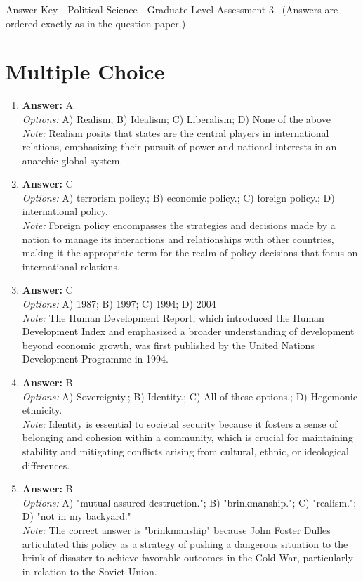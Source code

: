\documentclass[12pt]{article}
\begin{document}
\begin{center}
Answer Key - Political Science - Graduate Level Assessment 3 \
\small (Answers are ordered exactly as in the question paper.)
\end{center}

\section*{Multiple Choice}
\begin{enumerate}[label=\arabic*.]
\item \textbf{Answer:} A
\\ \textit{Options:} A) Realism; B) Idealism; C) Liberalism; D) None of the above
\\ \textit{Note:} Realism posits that states are the central players in international relations, emphasizing their pursuit of power and national interests in an anarchic global system.
\item \textbf{Answer:} C
\\ \textit{Options:} A) terrorism policy.; B) economic policy.; C) foreign policy.; D) international policy.
\\ \textit{Note:} Foreign policy encompasses the strategies and decisions made by a nation to manage its interactions and relationships with other countries, making it the appropriate term for the realm of policy decisions that focus on international relations.
\item \textbf{Answer:} C
\\ \textit{Options:} A) 1987; B) 1997; C) 1994; D) 2004
\\ \textit{Note:} The Human Development Report, which introduced the Human Development Index and emphasized a broader understanding of development beyond economic growth, was first published by the United Nations Development Programme in 1994.
\item \textbf{Answer:} B
\\ \textit{Options:} A) Sovereignty.; B) Identity.; C) All of these options.; D) Hegemonic ethnicity.
\\ \textit{Note:} Identity is essential to societal security because it fosters a sense of belonging and cohesion within a community, which is crucial for maintaining stability and mitigating conflicts arising from cultural, ethnic, or ideological differences.
\item \textbf{Answer:} B
\\ \textit{Options:} A) "mutual assured destruction."; B) "brinkmanship."; C) "realism."; D) "not in my backyard."
\\ \textit{Note:} The correct answer is "brinkmanship" because John Foster Dulles articulated this policy as a strategy of pushing a dangerous situation to the brink of disaster to achieve favorable outcomes in the Cold War, particularly in relation to the Soviet Union.
\end{enumerate}
\end{document}
